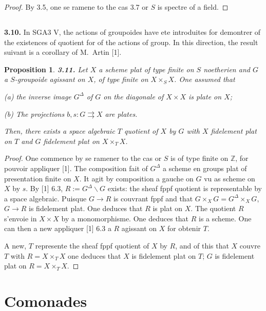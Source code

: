 \documentclass[12pt,a4paper]{article}
\theoremstyle{plain}
\newtheorem{proposition}[theorem]{Proposition}
\theoremstyle{definition}
\theoremstyle{remark}
\begin{document}
\begin{proof}
By 3.5, one se ramene to the cas 3.7 or $S$ is spectre of a field.
\end{proof}

\subsection{}

\textbf{3.10.} In SGA3 V, the actions of groupoides have ete introduites for demontrer of the existences of quotient for of the actions of group. In this direction, the result suivant is a corollary of M.~Artin [1].

\begin{proposition}\label{prop:3.11}
\textbf{3.11.} Let $X$ a scheme plat of type finite on $S$ noetherien and $G$ a $S$-groupoide agissant on $X$, of type finite on $X \times_S X$. One assumed that

(a) the inverse image $G^\Delta$ of $G$ on the diagonale of $X \times X$ is plate on $X$;

(b) The projections $b,s : G \rightrightarrows X$ are plates.

Then, there exists a space algebraic $T$ quotient of $X$ by $G$ with $X$ fidelement plat on $T$ and $G$ fidelement plat on $X \times_T X$.
\end{proposition}

\begin{proof}
One commence by se ramener to the cas or $S$ is of type finite on $\mathbb{Z}$, for pouvoir appliquer [1]. The composition fait of $G^\Delta$ a scheme en groups plat of presentation finite on $X$. It agit by composition a gauche on $G$ vu as scheme on $X$ by $s$. By [1] 6.3, $R := G^\Delta \backslash G$ exists: the sheaf fppf quotient is representable by a space algebraic. Puisque $G \to R$ is couvrant fppf and that $G \times_X G = G^\Delta \times_X G$, $G \to R$ is fidelement plat. One deduces that $R$ is plat on $X$. The quotient $R$ s'envoie in $X \times X$ by a monomorphisme. One deduces that $R$ is a scheme. One can then a new appliquer [1] 6.3 a $R$ agissant on $X$ for obtenir $T$.

A new, $T$ represente the sheaf fppf quotient of $X$ by $R$, and of this that $X$ couvre $T$ with $R = X \times_T X$ one deduces that $X$ is fidelement plat on $T$; $G$ is fidelement plat on $R = X \times_T X$.
\end{proof}


\section{Comonades}
\end{document}
